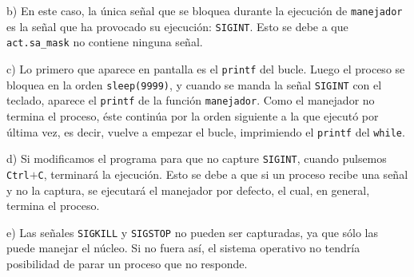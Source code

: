 \documentclass{article}
\begin{document}
b) En este caso, la única señal que se bloquea durante la ejecución de \texttt{manejador} es la señal que ha provocado su ejecución: \texttt{SIGINT}. Esto se debe a que \texttt{act.sa\_mask} no contiene ninguna señal.

c) Lo primero que aparece en pantalla es el \texttt{printf} del bucle. Luego el proceso se bloquea en la orden \texttt{sleep(9999)}, y cuando se manda la señal \texttt{SIGINT} con el teclado, aparece el \texttt{printf} de la función \texttt{manejador}. Como el manejador no termina el proceso, éste continúa por la orden siguiente a la que ejecutó por última vez, es decir, vuelve a empezar el bucle, imprimiendo el \texttt{printf} del \texttt{while}.

d) Si modificamos el programa para que no capture \texttt{SIGINT}, cuando pulsemos \texttt{Ctrl}$+$\texttt{C}, terminará la ejecución. Esto se debe a que si un proceso recibe una señal y no la captura, se ejecutará el manejador por defecto, el cual, en general, termina el proceso.

e) Las señales \texttt{SIGKILL} y \texttt{SIGSTOP} no pueden ser capturadas, ya que sólo las puede manejar el núcleo. Si no fuera así, el sistema operativo no tendría posibilidad de parar un proceso que no responde. 
\end{document}
